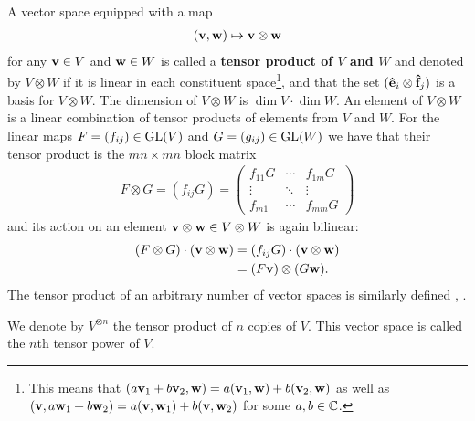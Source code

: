 A vector space equipped with a map
\begin{align*}
	(\mathbf{v}, \mathbf{w}) \mapsto \mathbf{v} \otimes \mathbf{w}
\end{align*}
for any $\mathbf{v} \in V$ and $\mathbf{w} \in W$ is called a \textbf{tensor product of $V$ and $W$} and denoted by $V \otimes W$ if it is linear in each constituent space\footnote{This means that $(a\mathbf{v}_1 + b\mathbf{v}_2, \mathbf{w}) =  a(\mathbf{v}_1, \mathbf{w}) + b(\mathbf{v}_2, \mathbf{w})$ as well as 
	$(\mathbf{v}, a\mathbf{w}_1 + b\mathbf{w}_2) = a(\mathbf{v}, \mathbf{w}_1) + b(\mathbf{v}, \mathbf{w}_2)$ for some $a,b \in \mathbb{C}$.
	}, and that the set $(\mathbf{\hat{e}}_i \otimes \mathbf{\hat{f}}_j)$ is a basis for $V \otimes W$. The dimension of $V \otimes W$ is $\dim V \cdot \dim W$. An element of $V \otimes W$ is a linear combination of tensor products of elements from $V$ and $W$. For the linear maps $F=(f_{ij}) \in \text{GL}(V)$ and $G=(g_{ij}) \in \text{GL}(W)$ we have that their tensor product is the $mn \times mn$ block matrix
\begin{align*}
		F \otimes G = (f_{ij}G) = \begin{pmatrix}
				f_{11}G & \cdots & f_{1m}G  \\
				\vdots & \ddots & \vdots \\
				f_{m1} & \cdots & f_{mm}G
			\end{pmatrix}
	\end{align*}
and its action on an element $\mathbf{v} \otimes \mathbf{w} \in V \otimes W$ is again bilinear:
\begin{align*}
		(F \otimes G) \cdot (\mathbf{v} \otimes \mathbf{w}) &= (f_{ij}G)  \cdot (\mathbf{v} \otimes \mathbf{w})  \\
		&= (F\mathbf{v}) \otimes (G\mathbf{w}).
	\end{align*} The tensor product of an arbitrary number of vector spaces is similarly defined \cite[Sect.1.5.]{Serre}, \cite[Sect.1.7.]{Sagan}.
	
\begin{notation}
	We denote by $V^{\otimes n}$ the tensor product of $n$ copies of $V$. This vector space is called the $n$th tensor power of $V$.
\end{notation}

